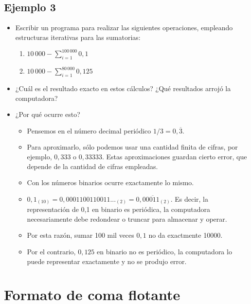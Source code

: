 \documentclass[openany]{book}
\providecommand{\tightlist}{%
  \setlength{\itemsep}{0pt}\setlength{\parskip}{0pt}}
\begin{document}
\hypertarget{ejemplo-3}{%
\subsection{Ejemplo 3}\label{ejemplo-3}}

\begin{itemize}
\item
  Escribir un programa para realizar las siguientes operaciones, empleando estructuras iterativas para las sumatorias:

  \begin{enumerate}
  \def\labelenumi{\alph{enumi})}
  \tightlist
  \item
    \(10 \, 000 - \sum_{i=1}^{100 \, 000} 0,1\)
  \item
    \(10 \, 000 - \sum_{i=1}^{80 \, 000} 0,125\)
  \end{enumerate}
\item
  ¿Cuál es el resultado exacto en estos cálculos? ¿Qué resultados arrojó la computadora?
\end{itemize}

\begin{itemize}
\item
  ¿Por qué ocurre esto?

  \begin{itemize}
  \tightlist
  \item
    Pensemos en el número decimal periódico \(1/3 = 0,\overline3\).
  \item
    Para aproximarlo, sólo podemos usar una cantidad finita de cifras, por ejemplo, \(0,333\) o \(0,33333\). Estas aproximaciones guardan cierto error, que depende de la cantidad de cifras empleadas.
  \item
    Con los números binarios ocurre exactamente lo mismo.
  \item
    \(0,1_{(10)} = 0,0001100110011..._{(2)} = 0,0\overline{0011}_{(2)}\). Es decir, la representación de 0,1 en binario es periódica, la computadora necesariamente debe redondear o truncar para almacenar y operar.
  \item
    Por esta razón, sumar 100 mil veces \(0,1\) no da exactmente 10000.
  \item
    Por el contrario, \(0,125\) en binario no es periódico, la computadora lo puede representar exactamente y no se produjo error.
  \end{itemize}
\end{itemize}

\hypertarget{formato-de-coma-flotante}{%
\section{Formato de coma flotante}\label{formato-de-coma-flotante}}
\end{document}
